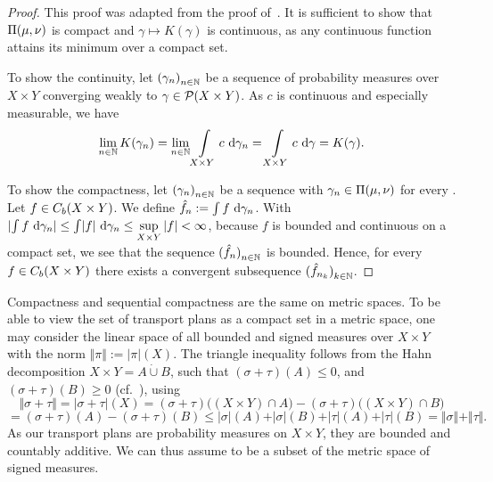 \begin{proof}
	This proof was adapted from the proof of\ \cite[Theorem~1.4]{San2015}. It is sufficient to show that $\TP{\mu}{\nu}$ is compact and $\gamma \mapsto K(\gamma)$ is continuous, as any continuous function attains its minimum over a compact set.

	To show the continuity, let ${(\gamma_n)}_{\NinN}$ be a sequence of probability measures over $X \times Y$ converging weakly to $\gamma \in \PM{X \times Y}$. As $c$ is continuous and especially measurable, we have
	\[ \lim\limits_{\NinN} K(\gamma_n) = \lim\limits_{\NinN} \int\limits_{X \times Y} c~\D[\gamma_n] = \int\limits_{X \times Y} c~\D[\gamma] = K(\gamma). \] 
	
	To show the compactness, let ${(\gamma_n)}_{\NinN}$ be a sequence with $\gamma_n \in \TP{\mu}{\nu}$ for every \NinN. Let $f \in \CF[b]{X \times Y}$. We define $\hat{f}_n := \int f~\D[\gamma_n]$. With $\lvert \int f~\D[\gamma_n] \rvert \le \int \lvert f \rvert~\D[\gamma_n] \le \sup\limits_{X \times Y} |f| < \infty$, because $f$ is bounded and continuous on a compact set, we see that the sequence ${(\hat{f}_n)}_{\NinN}$ is bounded. Hence, for every $f \in \CF[b]{X \times Y}$ there exists a convergent subsequence ${(\hat{f}_{n_k})}_{\NinN[k]}$.
\end{proof}

\begin{remark}
	Compactness and sequential compactness are the same on metric spaces. To be able to view the set of transport plans as a compact set in a metric space, one may consider the linear space of all bounded and signed measures over $X \times Y$ with the norm $\Vert \pi \Vert := |\pi|(X)$. The triangle inequality follows from the Hahn decomposition $X \times Y = A \dot{\cup} B$, such that $(\sigma + \tau)(A) \le 0$, and $(\sigma + \tau)(B) \ge 0$ (cf.\ \cite[Volume~1, Theorem~3.1.1 and Corollary~3.1.2]{Bog2007}), using
	\[ \Vert \sigma + \tau \Vert = \vert \sigma + \tau \vert (X) = (\sigma + \tau)\big( (X \times Y) \cap A \big) - (\sigma + \tau)\big( (X \times Y) \cap B \big) \]
	\[ = (\sigma + \tau)(A) - (\sigma + \tau)(B) \le \vert \sigma \vert (A) + \vert \sigma \vert (B) + \vert \tau \vert (A) + \vert \tau \vert (B) = \Vert \sigma \Vert + \Vert \tau \Vert. \]
	As our transport plans are probability measures on $X \times Y$, they are bounded and countably additive. We can thus assume \TP{\mu}{\nu} to be a subset of the metric space of signed measures.
\end{remark}

